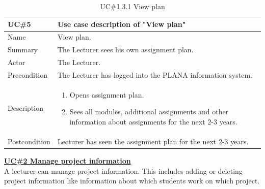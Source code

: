 \documentclass{scrartcl}
\begin{document}
\begin{table}[H]
\begin{center}
\begin{tabular}{| p{2.5cm}| p{12.5cm} |}
\hline
\textbf{UC\#5 } & \textbf{Use case description of "View plan" } \\
\hline
Name  & View plan.\\ \hline
	         Summary  & The Lecturer sees his own assignment plan. \\ \hline
	         Actor   & The Lecturer. \\ \hline
	         Precondition &  The Lecturer has logged into the PLANA information system. \\ \hline
	         Description & 
	         \begin{enumerate}
	   		\item Opens assignment plan.
			\item Sees all modules, additional assignments and other information about assignments for the next 2-3 years.
			
		
			
			\end{enumerate}
	             \\ \hline	        
	          Postcondition &  Lecturer has seen the assignment plan for the next 2-3 years. \\ \hline
	          
\end{tabular}
\end{center}
\caption{UC\#1.3.1 View plan}
\label{table2}
\end{table}

\pagebreak

 \textbf{\underline{UC\#2  Manage  project information}}    \\ 
 A lecturer can manage project information. This includes adding or deleting project information like information about which students work on which project. \\
\end{document}
